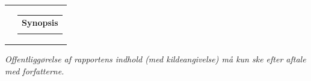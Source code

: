 \begin{nopagebreak}
{\begin{tabular}{cc}
{} &
\parbox{7cm}{
  \vspace{.15cm}
  \hfill 
  \begin{tabular}{l}
  \textbf{Synopsis}\bigskip \\
  \fbox{
    \parbox{6.5cm}{\bigskip
     {\vfill{\small 
     \bigskip}}
     }}
   \end{tabular}}
\end{tabular}} \vspace{0.5cm}
\centering
\textit{\tiny Offentliggørelse af rapportens indhold (med kildeangivelse) må kun ske efter aftale med forfatterne.}
\\
\end{nopagebreak}
%